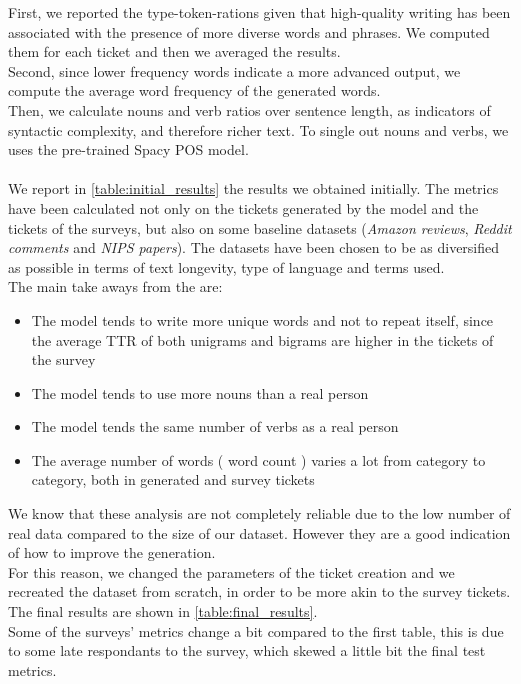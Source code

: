 First, we reported the type-token-rations given that high-quality writing has been associated with the presence of more diverse words and phrases\cite{pitler2008revisiting}. We computed them for each ticket and then we averaged the results. \\
Second, since lower frequency words indicate a more advanced output\cite{crossley2011development}, we compute the average word frequency of the generated words.\\
Then, we calculate nouns and verb ratios over sentence length, as indicators of syntactic complexity, and therefore richer text\cite{mcnamara2010linguistic}. To single out nouns and verbs, we uses the pre-trained Spacy POS model. \\\\
We report in \autoref{table:initial_results} the results we obtained initially. The metrics have been calculated not only on the tickets generated by the model and the tickets of the surveys, but also on some baseline datasets (\textit{Amazon reviews}, \textit{Reddit comments} and \textit{NIPS papers}). The datasets have been chosen to be as diversified as possible in terms of text longevity, type of language and terms used. \\ %
The main take aways from the are:
\begin{itemize}
    \item The model tends to write more unique words and not to repeat itself, since the average TTR of both unigrams and bigrams are higher in the tickets of the survey
    \item The model tends to use more nouns than a real person
    \item The model tends the same number of verbs as a real person
    \item The average number of words ( word count ) varies a lot from category to category, both in generated and survey tickets
\end{itemize}
We know that these analysis are not completely reliable due to the low number of real data compared to the size of our dataset. However they are a good indication of how to improve the generation. \\
For this reason, we changed the parameters of the ticket creation and we recreated the dataset from scratch, in order to be more akin to the survey tickets. \\
The final results are shown in \autoref{table:final_results}. \\
Some of the surveys' metrics change a bit compared to the first table, this is due to some late respondants to the survey, which skewed a little bit the final test metrics.

